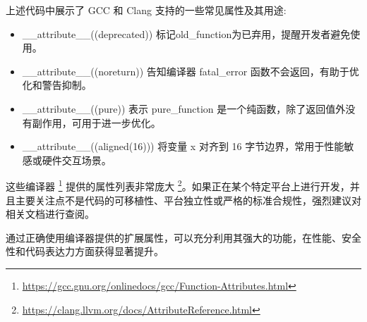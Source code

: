 上述代码中展示了 GCC 和 Clang 支持的一些常见属性及其用途:

\begin{itemize}
\item 
\_\_attribute\_\_((deprecated))  标记old\_function为已弃用，提醒开发者避免使用。

\item 
\_\_attribute\_\_((noreturn)) 告知编译器 fatal\_error 函数不会返回，有助于优化和警告抑制。

\item 
\_\_attribute\_\_((pure))  表示 pure\_function 是一个纯函数，除了返回值外没有副作用，可用于进一步优化。

\item 
\_\_attribute\_\_((aligned(16))) 将变量 x 对齐到 16 字节边界，常用于性能敏感或硬件交互场景。
\end{itemize}

这些编译器 \footnote{\url{https://gcc.gnu.org/onlinedocs/gcc/Function-Attributes.html}} 提供的属性列表非常庞大 \footnote{\url{https://clang.llvm.org/docs/AttributeReference.html}}。如果正在某个特定平台上进行开发，并且主要关注点不是代码的可移植性、平台独立性或严格的标准合规性，强烈建议对相关文档进行查阅。

通过正确使用编译器提供的扩展属性，可以充分利用其强大的功能，在性能、安全性和代码表达力方面获得显著提升。


